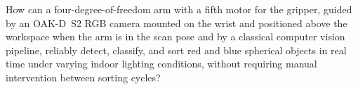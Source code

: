 
How can a four-degree-of-freedom arm with a fifth motor for the gripper, guided
by an OAK-D~S2 RGB camera mounted on the wrist and positioned above the workspace
when the arm is in the scan pose and by a classical computer vision pipeline,
reliably detect, classify, and sort red and blue spherical objects in real time
under varying indoor lighting conditions, without requiring manual intervention
between sorting cycles?
